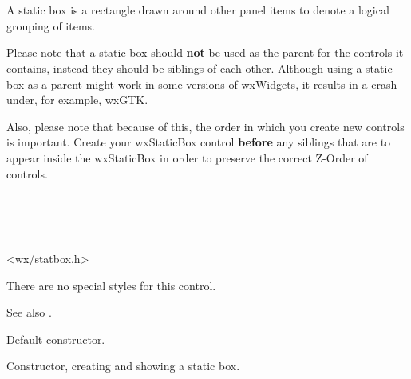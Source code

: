 \section{}\label{wxstaticbox}

A static box is a rectangle drawn around other panel items to denote
a logical grouping of items.

Please note that a static box should {\bf not} be used as the parent for the
controls it contains, instead they should be siblings of each other. Although
using a static box as a parent might work in some versions of wxWidgets, it
results in a crash under, for example, wxGTK. 

Also, please note that because of this, the order in which you create new 
controls is important. Create your wxStaticBox control {\bf before} any 
siblings that are to appear inside the wxStaticBox in order to preserve the 
correct Z-Order of controls.


\\
\\
\\


<wx/statbox.h>


There are no special styles for this control.

See also .




\label{wxstaticboxconstr}


Default constructor.


Constructor, creating and showing a static box.

